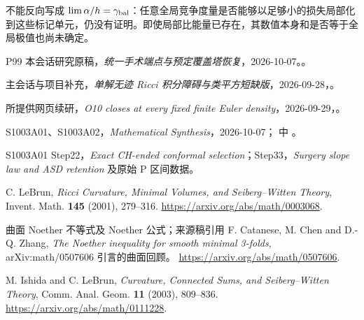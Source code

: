 \documentclass[UTF8,11pt,fontset=none]{ctexart}
\begin{document}
不能反向写成 \(\lim\alpha/h=\gamma_{\rm bal}\)：任意全局竞争度量是否能够以足够小的损失局部化到这些标记单元，仍没有证明。即使局部比能量已存在，其数值本身和是否等于全局极值也尚未确定。

\begin{thebibliography}{P99}
\small
{} 本会话研究原稿，\emph{统一手术端点与预定覆盖塔恢复}，2026-10-07。。

 主会话与项目补充，\emph{单解无迹 Ricci 积分障碍与类平方短缺版}，2026-09-28，。

 所提供网页续研，\emph{O10 closes at every fixed finite Euler density}，2026-09-29，。

 S1003A01、S1003A02，\emph{Mathematical Synthesis}，2026-10-07； 中 。

 S1003A01 Step22，\emph{Exact CH-ended conformal selection}；Step33，\emph{Surgery slope law and ASD retention} 及原始 P 区间数据。

 C. LeBrun, \emph{Ricci Curvature, Minimal Volumes, and Seiberg--Witten Theory}, Invent. Math. \textbf{145} (2001), 279--316. \url{https://arxiv.org/abs/math/0003068}.

 曲面 Noether 不等式及 Noether 公式；来源稿引用 F. Catanese, M. Chen and D.-Q. Zhang, \emph{The Noether inequality for smooth minimal 3-folds}, arXiv:math/0507606 引言的曲面回顾。 \url{https://arxiv.org/abs/math/0507606}.

 M. Ishida and C. LeBrun, \emph{Curvature, Connected Sums, and Seiberg--Witten Theory}, Comm. Anal. Geom. \textbf{11} (2003), 809--836. \url{https://arxiv.org/abs/math/0111228}.

\end{thebibliography}
\end{document}
